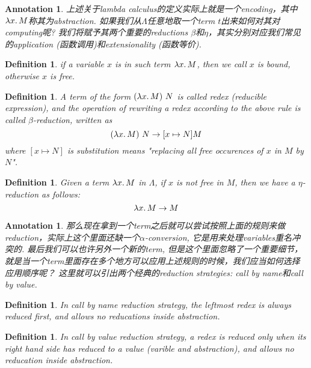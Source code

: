 \documentclass{article}
\newtheorem{definition}[theorem]{Definition}
\newtheorem{annotation}[theorem]{Annotation}
\newcommand{\lam}[2]{\ensuremath{\lambda #1\ldotp #2}} %
\begin{document}
\begin{annotation}
\rm 上述关于lambda calculus的定义实际上就是一个encoding，其中$\lam{x}{M}$称其为abstraction. 如果我们从$\Lambda$任意地取一个term $t$出来如何对其对computing呢? 我们将赋予其两个重要的reductions $\beta$和$\eta$，其实分别对应我们常见的application (函数调用)和extensionality (函数等价).
\end{annotation}

\begin{definition}
\rm if a variable $x$ is in such term $\lam{x}{M}$, then we call $x$ is bound, otherwise $x$ is free. 
\end{definition}

\begin{definition}
\rm A term of the form $(\lam{x}{M})~N$ is called redex (reducible expression), and the operation of rewriting a redex according to the above rule is called $\beta$-reduction, written as
\[
	(\lam{x}{M})~N \to [x \mapsto N] M
\]
where $[x \mapsto N]$ is substitution means "replacing all free occurences of $x$ in $M$ by $N$".
\end{definition}

\begin{definition}
\rm Given a term $\lam{x}{M}$ in $\Lambda$, if $x$ is not free in $M$, then we have a $\eta$-reduction as follows:
\[
	\lam{x}{M} \to M
\]  
\end{definition}

\begin{annotation}
\rm 那么现在拿到一个term之后就可以尝试按照上面的规则来做reduction，实际上这个里面还缺一个$\alpha$-conversion, 它是用来处理variables重名冲突的. 最后我们可以也许另外一个新的term, 但是这个里面忽略了一个重要细节，就是当一个term里面存在多个地方可以应用上述规则的时候，我们应当如何选择应用顺序呢？ 这里就可以引出两个经典的reduction strategies: \emph{call by name}和\emph{call by value}.
\end{annotation}

\begin{definition}
\rm In \emph{call by name} reduction strategy, the leftmost redex is always reduced first, and allows no reducations inside abstraction.  
\end{definition}

\begin{definition}
\rm In \emph{call by value} reduction strategy, a redex is reduced only when its right hand side has reduced to a \emph{value} (varible and abstraction), and allows no reducation inside abstraction.
\end{definition}
\end{document}
